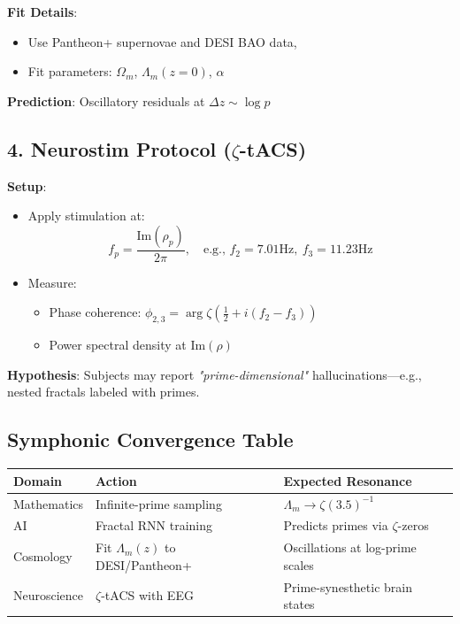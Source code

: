 \documentclass[12pt]{article}
\theoremstyle{plain}
\begin{document}
\textbf{Fit Details}:
\begin{itemize}
  \item Use Pantheon+ supernovae and DESI BAO data,
  \item Fit parameters: \( \Omega_m \), \( \Lambda_m(z=0) \), \( \alpha \)
\end{itemize}

\textbf{Prediction}:
Oscillatory residuals at \( \Delta z \sim \log p \)

\subsection*{4. Neurostim Protocol (\(\zeta\)-tACS)}
\textbf{Setup}:
\begin{itemize}
  \item Apply stimulation at:
  \[
  f_p = \frac{\text{Im}(\rho_p)}{2\pi}, \quad \text{e.g., } f_2 = 7.01\text{Hz},\ f_3 = 11.23\text{Hz}
  \]
  \item Measure:
  \begin{itemize}
    \item Phase coherence: \( \phi_{2,3} = \arg \zeta\left( \frac{1}{2} + i(f_2 - f_3) \right) \)
    \item Power spectral density at \(\text{Im}(\rho)\)
  \end{itemize}
\end{itemize}

\textbf{Hypothesis}:
Subjects may report \textit{"prime-dimensional"} hallucinations—e.g., nested fractals labeled with primes.

\subsection*{Symphonic Convergence Table}
\begin{center}
\begin{tabular}{|l|l|l|}
\hline
\textbf{Domain} & \textbf{Action} & \textbf{Expected Resonance} \\
\hline
Mathematics & Infinite-prime sampling & \(\Lambda_m \to \zeta(3.5)^{-1}\) \\
AI & Fractal RNN training & Predicts primes via \(\zeta\)-zeros \\
Cosmology & Fit \(\Lambda_m(z)\) to DESI/Pantheon+ & Oscillations at log-prime scales \\
Neuroscience & \(\zeta\)-tACS with EEG & Prime-synesthetic brain states \\
\hline
\end{tabular}
\end{center}
\end{document}
